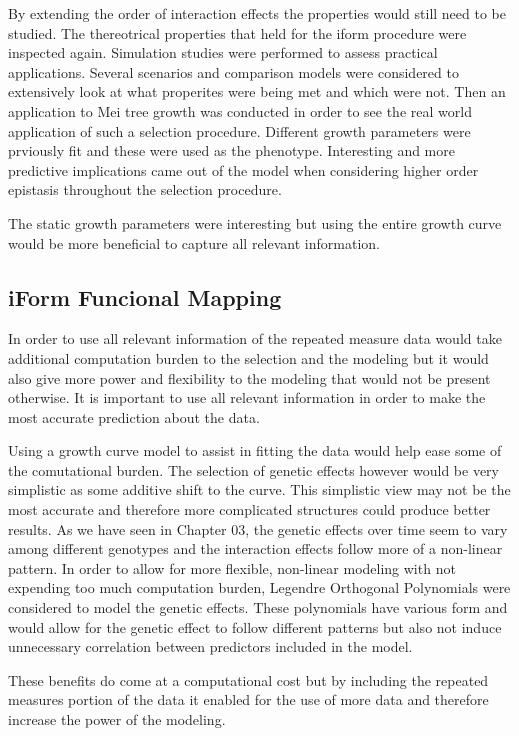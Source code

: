 \documentclass[11pt,]{book}
\theoremstyle{definition}
\theoremstyle{definition}
\theoremstyle{remark}
\begin{document}
By extending the order of interaction effects the properties would still
need to be studied. The thereotrical properties that held for the iform
procedure were inspected again. Simulation studies were performed to
assess practical applications. Several scenarios and comparison models
were considered to extensively look at what properites were being met
and which were not. Then an application to Mei tree growth was conducted
in order to see the real world application of such a selection
procedure. Different growth parameters were prviously fit and these were
used as the phenotype. Interesting and more predictive implications came
out of the model when considering higher order epistasis throughout the
selection procedure.

The static growth parameters were interesting but using the entire
growth curve would be more beneficial to capture all relevant
information.

\subsection{iForm Funcional Mapping}\label{iform-funcional-mapping}

In order to use all relevant information of the repeated measure data
would take additional computation burden to the selection and the
modeling but it would also give more power and flexibility to the
modeling that would not be present otherwise. It is important to use all
relevant information in order to make the most accurate prediction about
the data.

Using a growth curve model to assist in fitting the data would help ease
some of the comutational burden. The selection of genetic effects
however would be very simplistic as some additive shift to the curve.
This simplistic view may not be the most accurate and therefore more
complicated structures could produce better results. As we have seen in
Chapter 03, the genetic effects over time seem to vary among different
genotypes and the interaction effects follow more of a non-linear
pattern. In order to allow for more flexible, non-linear modeling with
not expending too much computation burden, Legendre Orthogonal
Polynomials were considered to model the genetic effects. These
polynomials have various form and would allow for the genetic effect to
follow different patterns but also not induce unnecessary correlation
between predictors included in the model.

These benefits do come at a computational cost but by including the
repeated measures portion of the data it enabled for the use of more
data and therefore increase the power of the modeling.
\end{document}
